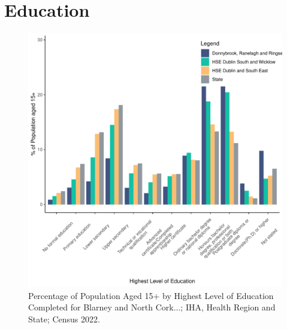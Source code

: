 \documentclass{article}
\begin{document}
\section{Education}\label{sect:Edu}
\begin{figure}[H]
	\centering
	\includegraphics[width = 120mm]{../figures/EduED.pdf}
	\caption{Percentage of Population Aged 15+ by Highest Level of Education Completed for Blarney and North Cork...; IHA, Health Region and State; Census 2022.}
	\label{fig:vbnv}
	\end{figure}
\end{document}
